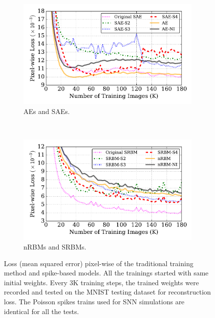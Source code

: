 \DIFdelend \DIFaddbegin \label{subsec:MNIST_recon}
\DIFaddend \begin{figure}
	\centering
	\begin{subfigure}[t]{0.8\textwidth}
		\includegraphics[width=\textwidth]{pics_sdlm/53_MNIST_SRBM_all/compare_recon.pdf}
		\caption{AEs and SAEs.}
	\end{subfigure}\\
	\begin{subfigure}[t]{0.8\textwidth}
		\includegraphics[width=\textwidth]{pics_sdlm/53_MNIST_SRBM_all/compare_recon_rbm.pdf}
		\caption{nRBMs and SRBMs.}
	\end{subfigure}
	\DIFdelbeginFL %
\DIFdelendFL \DIFaddbeginFL \caption[Loss comparisons of conventional models with spike-based models.]{\DIFaddendFL Loss (mean squared error) pixel-wise of the traditional training method and spike-based models. All the trainings started with same initial weights. Every 3K training steps, the trained weights were recorded and tested on the MNIST testing dataset for reconstruction loss. The Poisson spikes trains used for SNN simulations are identical for all the tests.}
	\label{fig:sdlm_loss}
\end{figure}

